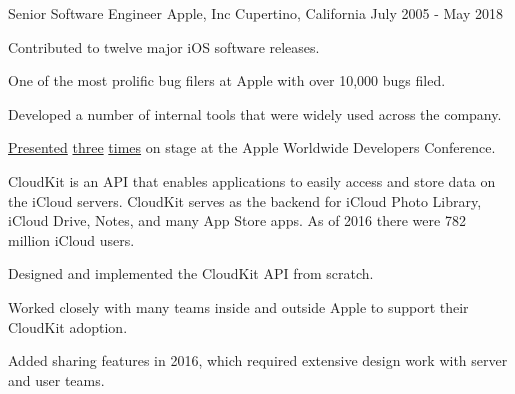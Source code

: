 

\begin{cventries}

  \cventry
    {Senior Software Engineer} %
    {Apple, Inc} %
    {Cupertino, California} %
    {July 2005 - May 2018} %
    {
    \vspace{-2.0mm}
        	\begin{cvitems}
         	\item {Contributed to twelve major iOS software releases.}
         	\item {One of the most prolific bug filers at Apple with over 10,000 bugs filed.}
         	\item {Developed a number of internal tools that were widely used across the company.}
		\item {\href{https://asciiwwdc.com/2010/sessions/129?q=local\%20notifications}{Presented} \href{https://developer.apple.com/videos/play/wwdc2014/231/}{three} \href{https://developer.apple.com/videos/play/wwdc2016/226/}{times} on stage at the Apple Worldwide Developers Conference.}
          \end{cvitems}
	\begin{cvsubentries}
       		{CloudKit is an API that enables applications to easily access and store data on the iCloud servers. \newline
		CloudKit serves as the backend for iCloud Photo Library, iCloud Drive, Notes, and many App Store apps. As of 2016 there were 782 million iCloud users.
		\vspace{2.0mm}
		\begin{cvitems}
         		\item {Designed and implemented the CloudKit API from scratch.}
         		\item {Worked closely with many teams inside and outside Apple to support their CloudKit adoption.}
         		\item {Added sharing features in 2016, which required extensive design work with server and user teams.}

\end{cvitems}}
\end{cvsubentries}}
\end{cventries}

